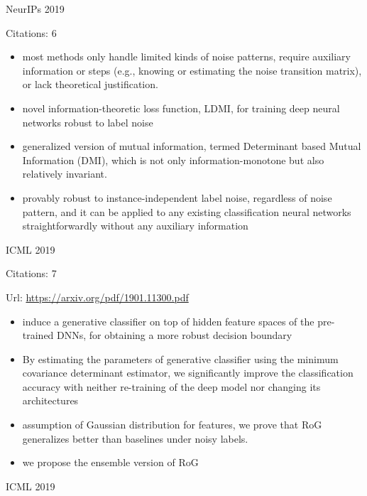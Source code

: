 \documentclass[11pt]{article}
\begin{document}
\noindent NeurIPs 2019

\noindent Citations: 6

\begin{itemize}
  \item most methods only handle limited kinds of noise patterns, require auxiliary information or steps (e.g., knowing or estimating the noise transition matrix), or lack theoretical justification. 
  \item novel information-theoretic loss function, LDMI, for training deep neural networks robust to label noise
  \item generalized version of mutual information, termed Determinant based Mutual Information (DMI), which is not only information-monotone but also relatively invariant.
  \item provably robust to instance-independent label noise, regardless of noise pattern, and it can be applied to any existing classification neural networks straightforwardly without any auxiliary information
\end{itemize}


\vspace{2cm}

\noindent ICML 2019

\noindent Citations: 7

\noindent Url: \url{https://arxiv.org/pdf/1901.11300.pdf}

\begin{itemize}
  \item induce a generative classifier on top of hidden feature spaces of the pre-trained DNNs, for obtaining a more robust decision boundary
  \item By estimating the parameters of generative classifier using the minimum covariance determinant estimator, we significantly improve the classification accuracy with neither re-training of the deep model nor changing its architectures
  \item assumption of Gaussian distribution for features, we prove that RoG generalizes better than baselines under noisy labels.
  \item we propose the ensemble version of RoG
\end{itemize}


\vspace{2cm}

\noindent ICML 2019
\end{document}
